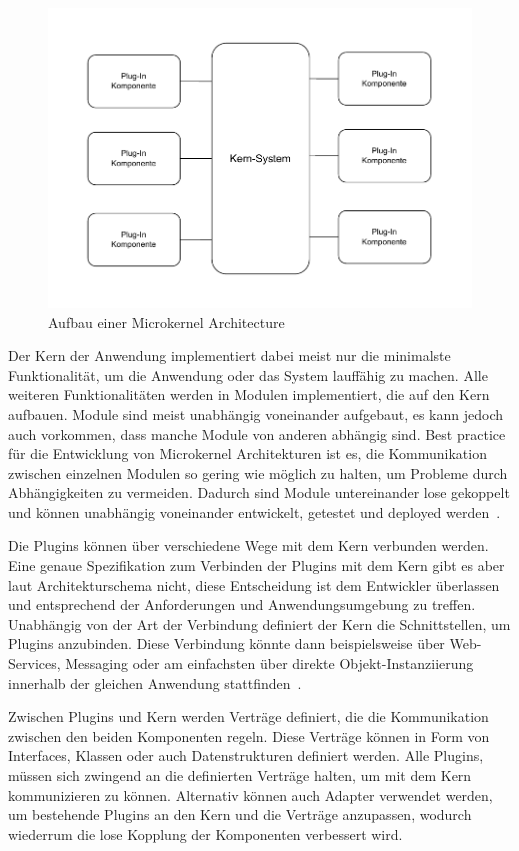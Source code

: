 \documentclass[acmtog]{acmart}
\begin{document}
\begin{figure}[!h]
  \centering
  \includegraphics[width=\linewidth]{images/microkernel/microkernel}
  \caption{Aufbau einer Microkernel Architecture}
  \label{fig:microkernel}
\end{figure}

Der Kern der Anwendung implementiert dabei meist nur die minimalste Funktionalität, um die Anwendung oder das System lauffähig zu machen.
Alle weiteren Funktionalitäten werden in Modulen implementiert, die auf den Kern aufbauen.
Module sind meist unabhängig voneinander aufgebaut, es kann jedoch auch vorkommen, dass manche Module von anderen abhängig sind.
Best practice für die Entwicklung von Microkernel Architekturen ist es, die Kommunikation zwischen einzelnen Modulen so gering wie möglich zu halten, um Probleme durch Abhängigkeiten zu vermeiden.
Dadurch sind Module untereinander lose gekoppelt und können unabhängig voneinander entwickelt, getestet und deployed werden~\cite[22]{architecturePatterns}.

Die Plugins können über verschiedene Wege mit dem Kern verbunden werden.
Eine genaue Spezifikation zum Verbinden der Plugins mit dem Kern gibt es aber laut Architekturschema nicht, diese Entscheidung ist dem Entwickler überlassen und entsprechend der Anforderungen und Anwendungsumgebung zu treffen.
Unabhängig von der Art der Verbindung definiert der Kern die Schnittstellen, um Plugins anzubinden.
Diese Verbindung könnte dann beispielsweise über Web-Services, Messaging oder am einfachsten über direkte Objekt-Instanziierung innerhalb der gleichen Anwendung stattfinden~\cite[22-23]{architecturePatterns}.

Zwischen Plugins und Kern werden Verträge definiert, die die Kommunikation zwischen den beiden Komponenten regeln.
Diese Verträge können in Form von Interfaces, Klassen oder auch Datenstrukturen definiert werden.
Alle Plugins, müssen sich zwingend an die definierten Verträge halten, um mit dem Kern kommunizieren zu können.
Alternativ können auch Adapter verwendet werden, um bestehende Plugins an den Kern und die Verträge anzupassen, wodurch wiederrum die lose Kopplung der Komponenten verbessert wird.
\end{document}
